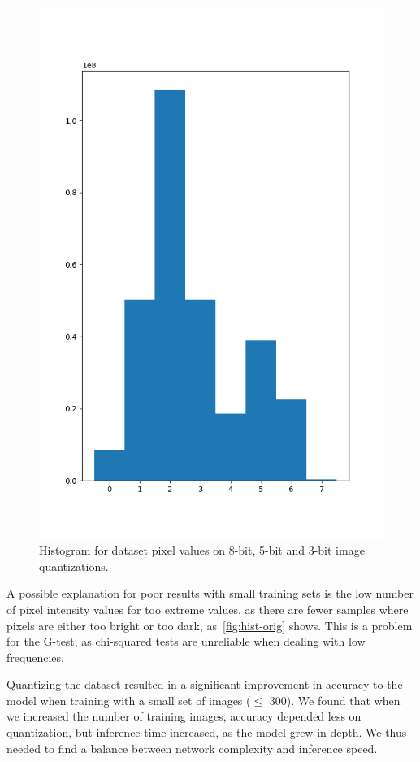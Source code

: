 \begin{figure}[h]
  \includegraphics[scale=0.3]{imgs/hist_3.png}
  \caption{Histogram for dataset pixel values on 8-bit, 5-bit and 3-bit image
    quantizations.\label{fig:hist-orig}}
\end{figure}

A possible explanation for poor results with small training sets is the low number of pixel
intensity values for too extreme values, as there are fewer samples where pixels are either too
bright or too dark, as~\autoref{fig:hist-orig} shows. This is a problem for the G-test, as
chi-squared tests are unreliable when dealing with low frequencies.

Quantizing the dataset resulted in a significant improvement in accuracy to the model when training
with a small set of images ($\leq$ 300). We found that when we increased the number of training
images, accuracy depended less on quantization, but inference time increased, as the model grew in
depth. We thus needed to find a balance between network complexity and inference speed.

